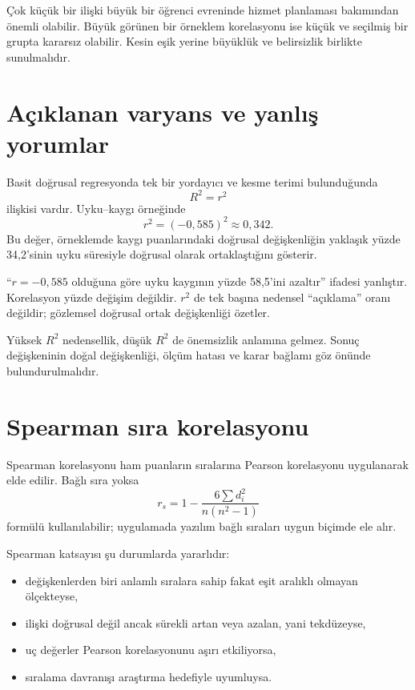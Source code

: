 Çok küçük bir ilişki büyük bir öğrenci evreninde hizmet planlaması bakımından
önemli olabilir. Büyük görünen bir örneklem korelasyonu ise küçük ve seçilmiş
bir grupta kararsız olabilir. Kesin eşik yerine büyüklük ve belirsizlik birlikte
sunulmalıdır.

\section{Açıklanan varyans ve yanlış yorumlar}

Basit doğrusal regresyonda tek bir yordayıcı ve kesme terimi bulunduğunda
\[
R^2=r^2
\]
ilişkisi vardır. Uyku--kaygı örneğinde
\[
r^2=(-0{,}585)^2\approx0{,}342.
\]
Bu değer, örneklemde kaygı puanlarındaki doğrusal değişkenliğin yaklaşık yüzde
34,2'sinin uyku süresiyle doğrusal olarak ortaklaştığını gösterir.

\begin{mistakebox}
``$r=-0{,}585$ olduğuna göre uyku kaygının yüzde 58,5'ini azaltır'' ifadesi
yanlıştır. Korelasyon yüzde değişim değildir. $r^2$ de tek başına nedensel
``açıklama'' oranı değildir; gözlemsel doğrusal ortak değişkenliği özetler.
\end{mistakebox}

Yüksek $R^2$ nedensellik, düşük $R^2$ de önemsizlik anlamına gelmez. Sonuç
değişkeninin doğal değişkenliği, ölçüm hatası ve karar bağlamı göz önünde
bulundurulmalıdır.

\section{Spearman sıra korelasyonu}

Spearman korelasyonu ham puanların sıralarına Pearson korelasyonu uygulanarak
elde edilir. Bağlı sıra yoksa
\[
r_s=1-\frac{6\sum d_i^2}{n(n^2-1)}
\]
formülü kullanılabilir; uygulamada yazılım bağlı sıraları uygun biçimde ele
alır.

Spearman katsayısı şu durumlarda yararlıdır:

\begin{itemize}
  \item değişkenlerden biri anlamlı sıralara sahip fakat eşit aralıklı olmayan ölçekteyse,
  \item ilişki doğrusal değil ancak sürekli artan veya azalan, yani tekdüzeyse,
  \item uç değerler Pearson korelasyonunu aşırı etkiliyorsa,
  \item sıralama davranışı araştırma hedefiyle uyumluysa.
\end{itemize}

